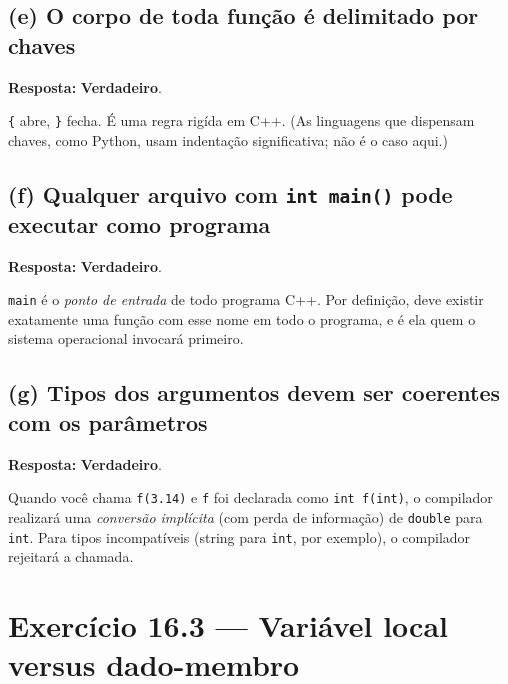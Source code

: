 \documentclass[11pt,a4paper]{article}
\begin{document}
\subsection*{(e) O corpo de toda fun\c{c}\~ao \'e delimitado por chaves}

\begin{resposta}\textbf{Resposta:} \textbf{Verdadeiro}.\end{resposta}

\texttt{\{} abre, \texttt{\}} fecha. \'E uma regra rig\'ida em C++. (As linguagens que dispensam chaves, como Python, usam indenta\c{c}\~ao significativa; n\~ao \'e o caso aqui.)

\subsection*{(f) Qualquer arquivo com \texttt{int main()} pode executar como programa}

\begin{resposta}\textbf{Resposta:} \textbf{Verdadeiro}.\end{resposta}

\texttt{main} \'e o \emph{ponto de entrada} de todo programa C++. Por defini\c{c}\~ao, deve existir exatamente uma fun\c{c}\~ao com esse nome em todo o programa, e \'e ela quem o sistema operacional invocar\'a primeiro.

\subsection*{(g) Tipos dos argumentos devem ser coerentes com os par\^ametros}

\begin{resposta}\textbf{Resposta:} \textbf{Verdadeiro}.\end{resposta}

Quando voc\^e chama \texttt{f(3.14)} e \texttt{f} foi declarada como \texttt{int f(int)}, o compilador realizar\'a uma \emph{convers\~ao impl\'icita} (com perda de informa\c{c}\~ao) de \texttt{double} para \texttt{int}. Para tipos incompat\'iveis (string para \texttt{int}, por exemplo), o compilador rejeitar\'a a chamada.

\section{Exerc\'icio 16.3 --- Vari\'avel local versus dado-membro}
\end{document}
